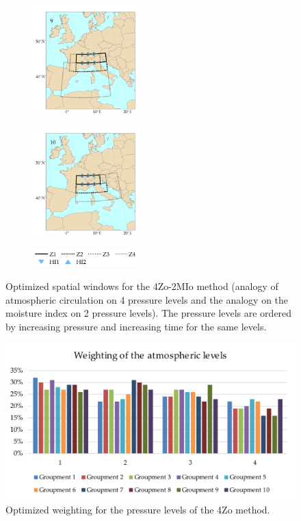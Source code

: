 \documentclass[5p]{elsarticle}
\begin{document}
\begin{figure}[htb]
\begin{subfigure}{.5\columnwidth}
	\end{subfigure}
	\begin{subfigure}{.5\columnwidth}
		\centering
		\includegraphics[width=4.2cm]{figures/spatial_win_z4-hi2/Spatial_windows_9.png}
	\end{subfigure}%
	\begin{subfigure}{.5\columnwidth}
		\centering
		\includegraphics[width=4.2cm]{figures/spatial_win_z4-hi2/Spatial_windows_10.png}
	\end{subfigure}
	\begin{subfigure}{.5\columnwidth}
		\centering
		\includegraphics[width=4.2cm]{figures/spatial_win_z4-hi2/legend.png}
	\end{subfigure}
	\caption{Optimized spatial windows for the 4Zo-2MIo method (analogy of atmospheric circulation on 4 pressure levels and the analogy on the moisture index on 2 pressure levels). The pressure levels are ordered by increasing pressure and increasing time for the same levels.}
	\label{fig:spatial_windows_4Zo-2MIo}
\end{figure}


\begin{figure}[htb]
	\centerline{\includegraphics[width=\linewidth]{figures/figure_levels_weights.pdf}}
	\caption{Optimized weighting for the pressure levels of the 4Zo method.}
	\label{fig:levels_weights}
\end{figure}
\end{document}
